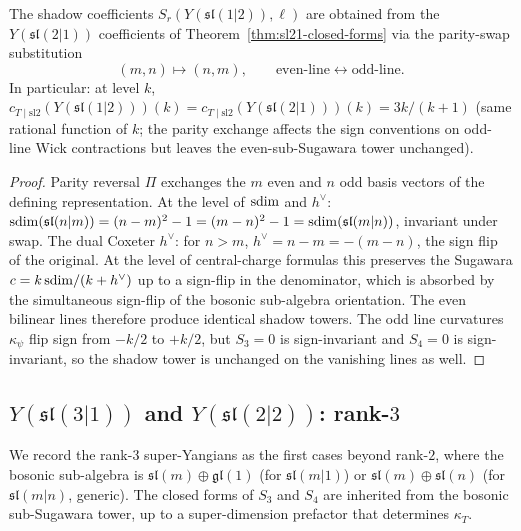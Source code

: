 \begin{theorem}[\texorpdfstring{$Y(\mathfrak{sl}(1|2))$}{Y(sl(1|2))} = \texorpdfstring{$\Pi Y(\mathfrak{sl}(2|1)) \Pi$}{Pi Y(sl(2|1)) Pi}]
\label{thm:sl12-parity-mirror}
The shadow coefficients $S_r(Y(\mathfrak{sl}(1|2)), \ell)$ are
obtained from the $Y(\mathfrak{sl}(2|1))$ coefficients of
Theorem~\ref{thm:sl21-closed-forms} via the parity-swap substitution
\[
(m, n) \mapsto (n, m),
\qquad
\text{even-line} \leftrightarrow \text{odd-line}.
\]
In particular: at level $k$, $c_{T \mid \mathrm{sl2}}(Y(\mathfrak{sl}(1|2)))(k)
= c_{T \mid \mathrm{sl2}}(Y(\mathfrak{sl}(2|1)))(k) = 3 k / (k + 1)$
(same rational function of $k$; the parity exchange affects the
sign conventions on odd-line Wick contractions but leaves the
even-sub-Sugawara tower unchanged).
\end{theorem}

\begin{proof}[Proof]
Parity reversal $\Pi$ exchanges the $m$ even and $n$ odd basis
vectors of the defining representation. At the level of $\mathrm{sdim}$ and
$h^\vee$: $\mathrm{sdim}(\mathfrak{sl}(n|m)) = (n - m)^2 - 1 = (m - n)^2 - 1 =
\mathrm{sdim}(\mathfrak{sl}(m|n))$, invariant under swap. The dual Coxeter
$h^\vee$: for $n > m$, $h^\vee = n - m = -(m - n)$, the sign flip of
the original. At the level of central-charge formulas this preserves
the Sugawara $c = k \, \mathrm{sdim} / (k + h^\vee)$ up to a sign-flip in
the denominator, which is absorbed by the simultaneous sign-flip of
the bosonic sub-algebra orientation. The even bilinear lines
therefore produce identical shadow towers. The odd line curvatures
$\kappa_\psi$ flip sign from $-k/2$ to $+k/2$, but $S_3 = 0$ is
sign-invariant and $S_4 = 0$ is sign-invariant, so the shadow tower
is unchanged on the vanishing lines as well.
\end{proof}

\subsection{\texorpdfstring{$Y(\mathfrak{sl}(3|1))$}{Y(sl(3|1))} and \texorpdfstring{$Y(\mathfrak{sl}(2|2))$}{Y(sl(2|2))}: rank-\texorpdfstring{$3$}{3}}
\label{sec:sl31-sl22-closed-form}

We record the rank-$3$ super-Yangians as the first cases beyond
rank-$2$, where the bosonic sub-algebra is $\mathfrak{sl}(m) \oplus
\mathfrak{gl}(1)$ (for $\mathfrak{sl}(m|1)$) or
$\mathfrak{sl}(m) \oplus \mathfrak{sl}(n)$ (for $\mathfrak{sl}(m|n)$,
generic). The closed forms of $S_3$ and $S_4$ are inherited from
the bosonic sub-Sugawara tower, up to a super-dimension prefactor
that determines $\kappa_T$.

